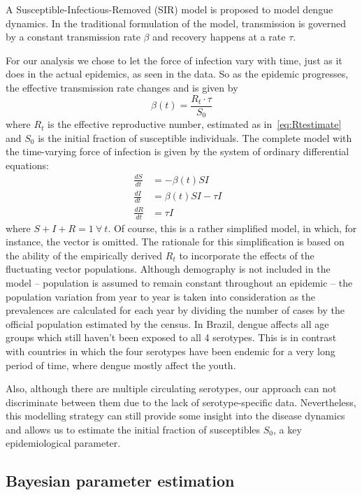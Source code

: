 \documentclass[10pt]{article}
\begin{document}
A Susceptible-Infectious-Removed (SIR) model is proposed to model dengue 
dynamics.
In the traditional formulation of the model, transmission is governed by a 
constant transmission rate $\beta$ and recovery happens at a rate $\tau$.

For our analysis we chose to let the force of infection vary with time, just 
as it does in the actual epidemics, as seen in the data. So as the epidemic 
progresses, the effective transmission  rate changes and is 
given by 
\begin{equation} 
 \label{eq:effbeta}
 \beta(t) = \frac{R_t\cdot\tau}{S_0}
\end{equation}
where $R_t$ is the effective reproductive number, estimated as 
in~\ref{eq:Rtestimate} and $S_0$ is the initial fraction of susceptible 
individuals.
The complete model with the time-varying force of infection is given by
the system of ordinary differential equations:
\begin{align}
   \label{eq:model}
 \frac{dS}{dt} &= -\beta(t)SI \\     \nonumber
 \frac{dI}{dt} &= \beta(t)SI - \tau I&\\      \nonumber
 \frac{dR}{dt} &= \tau I&
\end{align}  
where $S + I + R = 1 \: \forall\: t$. %
Of course, this is a rather simplified model, in which, for instance, the 
vector is omitted.
The rationale for this simplification is based on the ability of the 
empirically derived $R_t$  to incorporate the effects of the fluctuating vector 
populations. Although demography is not included in the model -- population is 
assumed to remain constant throughout an epidemic -- the population variation 
from year to year is taken into consideration as the prevalences are calculated 
for each year by dividing the number of cases by the official population 
estimated by the census. In Brazil, dengue affects all age groups which still 
haven't been exposed to all 4 serotypes. This is in contrast with countries in 
which the four serotypes have been endemic for a very long period of time, 
where dengue mostly affect the youth.

Also, although there are multiple circulating serotypes, our approach
can not discriminate between them due to the lack of serotype-specific data.
Nevertheless, this modelling strategy can still provide some insight into the 
disease dynamics and allows us to estimate the initial fraction of susceptibles 
$S_0$, a key epidemiological parameter.

\subsection*{Bayesian parameter estimation}
\end{document}

